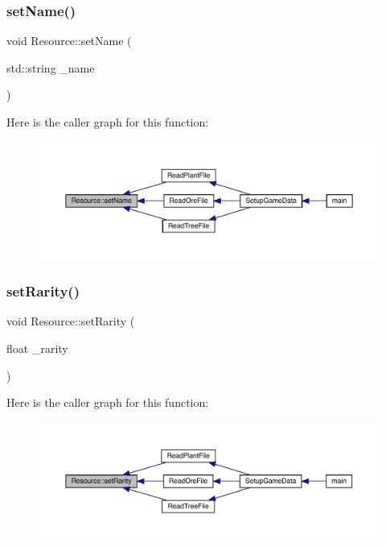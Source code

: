 \subsubsection{\texorpdfstring{set\+Name()}{setName()}}
{\footnotesize\ttfamily void Resource\+::set\+Name (\begin{DoxyParamCaption}\item[{std\+::string}]{\+\_\+name }\end{DoxyParamCaption})}

Here is the caller graph for this function\+:
\nopagebreak
\begin{figure}[H]
\begin{center}
\leavevmode
\includegraphics[width=350pt]{df/d00/class_resource_a644f765b367972686b6d0b9c7a0ce9dd_icgraph}
\end{center}
\end{figure}
\mbox{\label{class_resource_a50c203483e76ae918b16db164c212e08}} 
\subsubsection{\texorpdfstring{set\+Rarity()}{setRarity()}}
{\footnotesize\ttfamily void Resource\+::set\+Rarity (\begin{DoxyParamCaption}\item[{float}]{\+\_\+rarity }\end{DoxyParamCaption})}

Here is the caller graph for this function\+:
\nopagebreak
\begin{figure}[H]
\begin{center}
\leavevmode
\includegraphics[width=350pt]{df/d00/class_resource_a50c203483e76ae918b16db164c212e08_icgraph}
\end{center}
\end{figure}
\mbox{\label{class_resource_adc6d68e48afd6949da3211ed2668ddbd}} 

